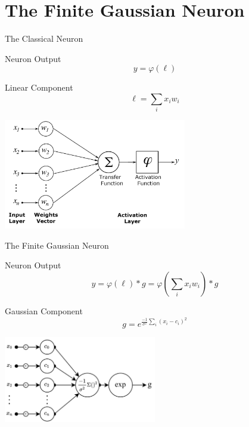 \documentclass{beamer}
\begin{document}
    



\section{The Finite Gaussian Neuron}

\begin{frame}{The Classical Neuron}
    \begin{block}{Neuron Output}
        \vspace{-1.5mm}
        $$y = \varphi(\ell)$$
    \end{block}
    \begin{block}{Linear Component}
        $$\ell=\sum_i x_i w_i$$
    \end{block}
    \begin{center}
        \includegraphics[width=0.6\textwidth]{images/artificial_neuron_model.png}
    \end{center}
\end{frame}

\begin{frame}{The Finite Gaussian Neuron}
    \begin{block}{Neuron Output}
        $$ y =  \varphi(\ell)*g = \varphi(\sum_i x_i w_i) * g$$
    \end{block}
    \begin{block}{Gaussian Component}
    $$ g = e^{\frac{-1}{\sigma^2}\sum_{i}(x_i-c_i)^2}$$
    \end{block}
    \begin{center}
        \includegraphics[width=0.5\textwidth]{images/fgn-gaussian-component.png}
    \end{center}
\end{frame}
\end{document}
